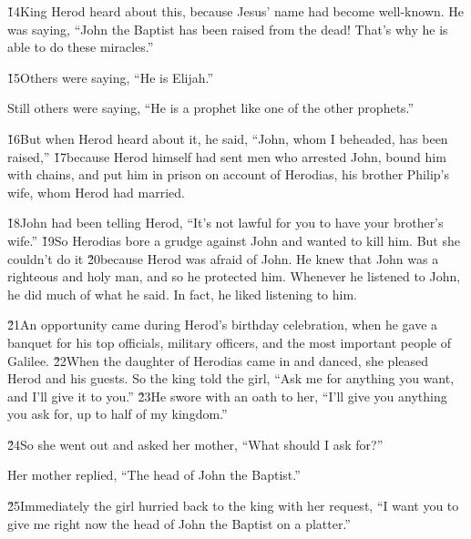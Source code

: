 \v{14}King Herod heard about this, because Jesus' name had become well-known. He was saying, ``John the Baptist has been raised from the dead! That's why he is able to do these miracles.''

\v{15}Others were saying, ``He is Elijah.''

Still others were saying, ``He is a prophet like one of the other prophets.''

\v{16}But when Herod heard about it, he said, ``John, whom I beheaded, has been raised,'' \v{17}because Herod himself had sent men who arrested John, bound him with chains, and put him in prison on account of Herodias, his brother Philip's wife, whom Herod had married.

\v{18}John had been telling Herod, ``It's not lawful for you to have your brother's wife.'' \v{19}So Herodias bore a grudge against John and wanted to kill him. But she couldn't do it \v{20}because Herod was afraid of John. He knew that John was a righteous and holy man, and so he protected him. Whenever he listened to John, he did much of what he said. In fact, he liked listening to him.

\v{21}An opportunity came during Herod's birthday celebration, when he gave a banquet for his top officials, military officers, and the most important people of Galilee. \v{22}When the daughter of Herodias came in and danced, she pleased Herod and his guests. So the king told the girl, ``Ask me for anything you want, and I'll give it to you.'' \v{23}He swore with an oath to her, ``I'll give you anything you ask for, up to half of my kingdom.''

\v{24}So she went out and asked her mother, ``What should I ask for?''

Her mother replied, ``The head of John the Baptist.''

\v{25}Immediately the girl hurried back to the king with her request, ``I want you to give me right now the head of John the Baptist on a platter.''

